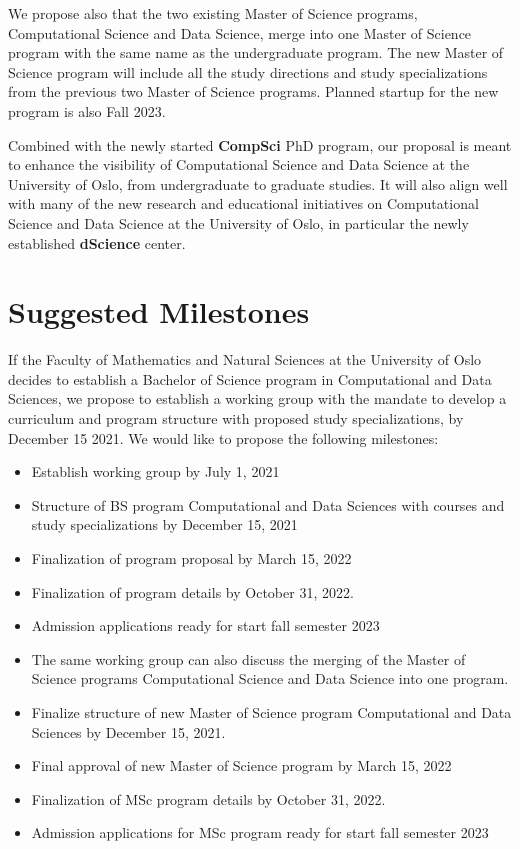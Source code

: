 \documentclass[oneside,final,10pt]{article}
\begin{document}
We propose also that the two existing Master of Science programs, Computational Science and Data Science, merge into one Master of Science program with the same name as the undergraduate program. The new Master of Science program will include all the study directions and study specializations from the previous two Master of Science programs. Planned startup for the new program is also Fall 2023. 

Combined with the newly started {\bf CompSci} PhD program, our proposal is meant to enhance the visibility of Computational Science and Data Science at the University of Oslo, from undergraduate to graduate studies. It will also align well with many of the new research and educational initiatives on Computational Science and Data Science at the University of Oslo, in particular the newly established {\bf dScience} center. 
\section*{Suggested Milestones}
If the Faculty of Mathematics and Natural Sciences at the University of Oslo decides to establish a Bachelor of Science program in Computational  and Data Sciences, we propose to establish a working group with the mandate  to develop a curriculum and program structure with proposed study specializations, by December 15 2021.  We would like to propose the following milestones:
\begin{itemize}
    \item Establish working group by July 1, 2021
    \item Structure of BS program Computational and Data Sciences with courses and study specializations by December 15, 2021
    \item Finalization of program proposal by March 15, 2022
    \item Finalization of program details by October 31, 2022.
    \item Admission applications ready for start fall semester 2023
    \item The same working group can also discuss the merging of the Master of Science programs Computational Science and Data Science into one program. 
    \item Finalize structure of new Master of Science program Computational and Data Sciences by December 15, 2021.
    \item Final approval of new Master of Science program by March 15, 2022
    \item Finalization of MSc program details by October 31, 2022.
    \item Admission applications for MSc program ready for start fall semester 2023
\end{itemize}
\end{document}

